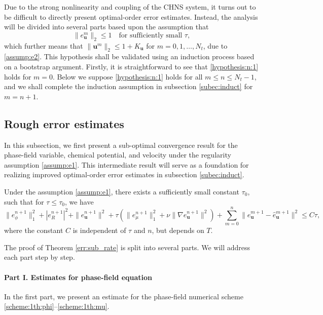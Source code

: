 Due to the strong nonlinearity and coupling of the CHNS system,  it turns out to be difficult to directly present optimal-order error estimates. Instead, the analysis will be divided into several parts based upon the assumption that %
\begin{equation} \label{hypothesis:n:1}
	\|e_{\bm u}^{m}\|_2 \le 1 \quad \text{for sufficiently small } \tau,
\end{equation}     
which further means that  $\|\bm u^{m}\|_2 \le 1+K_{\bm u}$
for $m=0,1,\dots, N_t$, due to \eqref{assump:e2}.
This hypothesis shall be validated using an induction process based on a bootstrap argument. Firstly, it is straightforward to see that \eqref{hypothesis:n:1} holds for $m = 0$. Below we suppose \eqref{hypothesis:n:1} holds for all $m \le n \le N_t-1$,
and we shall complete the induction assumption in subsection \ref{subec:induct} for $m=n+1$.

\subsection{Rough error estimates} \label{subsec:reduce_rate}
In this subsection, we first present a sub-optimal convergence result for the phase-field variable, chemical potential, and velocity under the regularity assumption \eqref{assump:e1}. This intermediate result will serve as a foundation for realizing improved optimal-order error estimates in subsection \ref{subec:induct}.
\begin{theorem} \label{err:sub_rate}
	Under the assumption \eqref{assump:e1}, 
	there exists a sufficiently small constant $\tau_0$, such that for $\tau \le \tau_0$, we have
	\begin{equation*} 
		\|e_\phi^{n+1}\|_1^2+|e_R^{n+1}|^2 +\|e_{\bm u}^{n+1}\|^2+ \tau (\|e_\mu^{n+1}\|_1^2 + \nu \|\nabla e_{\bm u}^{n+1}\|^2) + \sum_{m=0}^{n} \|e_{\bm u}^{m+1}-\widehat{e}_{\bm u}^{m+1}\|^2 		\leq C  \tau,
	\end{equation*}
	where the constant $C$ is independent of $\tau$ and $n$, but depends on $T$.
\end{theorem}
The proof of Theorem \ref{err:sub_rate} is split into several parts. We will address each part step by step.

\paragraph{\bf \indent Part I. Estimates for phase-field equation}
In the first part, we present an estimate for the phase-field numerical scheme \eqref{scheme:1th:phi}--\eqref{scheme:1th:mu}.

